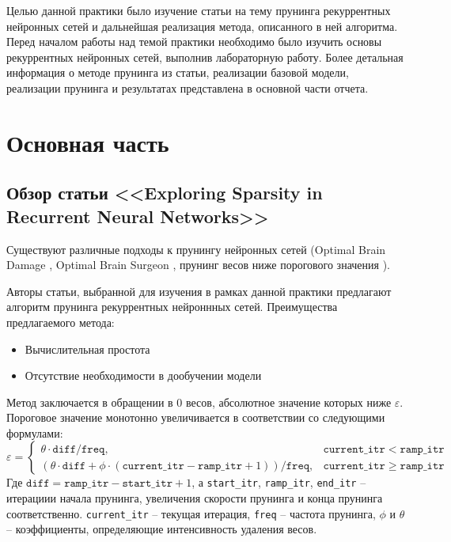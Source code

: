 \documentclass[12pt]{article}
\begin{document}
Целью данной практики было изучение статьи \cite{DBLP:journals/corr/NarangDSE17} на тему прунинга рекуррентных 
нейронных сетей и дальнейшая реализация метода, описанного в ней алгоритма.
Перед началом работы над темой практики необходимо было изучить основы рекуррентных нейронных
сетей, выполнив лабораторную работу. Более детальная информация о 
методе прунинга из статьи, реализации базовой модели, реализации прунинга и результатах представлена 
в основной части отчета. 
\section*{Основная часть}
%

\subsection*{Обзор статьи <<Exploring Sparsity in Recurrent Neural Networks>> \cite{DBLP:journals/corr/NarangDSE17}}
%
Существуют различные подходы к прунингу нейронных сетей (Optimal Brain Damage \cite{Cun:1990:OBD:109230.109298},
Optimal Brain Surgeon \cite{Hassibi}, прунинг весов ниже порогового значения \cite{DBLP:journals/corr/HanPTD15}).

Авторы статьи, выбранной для изучения в рамках данной практики предлагают алгоритм прунинга рекуррентных нейроннных сетей.
Преимущества предлагаемого метода:
\begin{itemize}
  \item Вычислительная простота
  \item Отсутствие необходимости в дообучении модели
\end{itemize}
Метод заключается в обращении в $0$ весов, абсолютное значение которых ниже $\varepsilon$. Пороговое значение монотонно 
увеличивается в соответствии со следующими формулами:
\begin{equation}
  \varepsilon = \begin{cases}
    \theta \cdot \mathtt{diff} / \mathtt{freq}, & \mathtt{current\_itr} < \mathtt{ramp\_itr} \\
    \left(\theta \cdot \mathtt{diff} + \phi \cdot (\mathtt{current{\_}itr} - \mathtt{ramp\_itr} + 1)\right) / \mathtt{freq}, & \mathtt{current\_itr} \geqslant \mathtt{ramp\_itr}
  \end{cases}
  \label{eq:eps}
\end{equation}
Где $\mathtt{diff} = \mathtt{ramp\_itr} - \mathtt{start\_itr} + 1$, а \texttt{start\_itr}, \texttt{ramp\_itr}, \texttt{end\_itr} -- 
итерациии начала прунинга, увеличения скорости прунинга и конца прунинга соответственно. \texttt{current\_itr} -- текущая итерация, \texttt{freq} -- частота прунинга, $\phi$ и $\theta$ --
коэффициенты, определяющие интенсивность удаления весов. 
\end{document}
